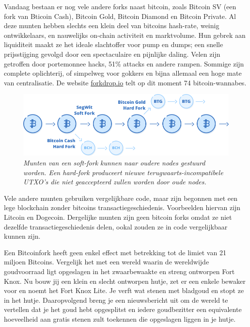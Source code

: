 \documentclass[smalldemyvopaper,11pt,twoside,onecolumn,openright,extrafontsizes]{memoir}
\newlength\drop
\begin{document}
Vandaag bestaan er nog vele andere forks naast bitcoin, zoals Bitcoin SV (een fork van Bticoin Cash), Bitcoin Gold, Bitcoin Diamond en Bitcoin Private. Al deze munten hebben slechts een klein deel van bitcoins hash-rate, weinig ontwikkelaars, en nauwelijks on-chain activiteit en marktvolume. Hun gebrek aan liquiditeit maakt ze het ideale slachtoffer voor pump en dumps; een snelle prijsstijging gevolgd door een spectaculaire en pijnlijke daling. Velen zijn getroffen door portemonnee hacks, 51\% attacks en andere rampen. Sommige zijn complete oplichterij, of simpelweg voor gokkers en bijna allemaal een hoge mate van centralisatie. De website \href{https://forkdrop.io/}{forkdrop.io} telt op dit moment 74 bitcoin-wannabes.

\begin{figure}
    \centering
    \includegraphics[width=\textwidth]{images/fig15.png}
    \caption{\footnotesize{\textit{Munten van een soft-fork kunnen naar oudere nodes gestuurd worden. Een hard-fork produceert nieuwe terugwaarts-incompatibele UTXO's die niet geaccepteerd zullen worden door oude nodes.}}}
    \label{fig15}
\end{figure}

Vele andere munten gebruiken vergelijkbare code, maar zijn begonnen met een lege blockchain zonder bitcoins transactiegeschiedenis. Voorbeelden hiervan zijn Litcoin en Dogecoin. Dergelijke munten zijn geen bitcoin forks omdat ze niet dezelfde transactiegeschiedenis delen, ookal zouden ze in code vergelijkbaar kunnen zijn. 

Een Bitcoinfork heeft geen enkel effect met betrekking tot de limiet van 21 miljoen Bitcoins. Vergelijk het met een wereld waarin de wereldwijde goudvoorraad ligt opgeslagen in het zwaarbewaakte en streng ontworpen Fort Knox. Nu bouw jij een klein en slecht ontworpen hutje, zet er een enkele bewaker voor en noemt het Fort Knox Lite. Je verft wat stenen met bladgoud en stopt ze in het hutje. Daaropvolgend breng je een nieuwsbericht uit om de wereld te vertellen dat je het goud hebt opgesplitst en iedere goudbezitter een equivalente hoeveelheid aan gratis stenen zult toekennen die opgeslagen liggen in je hutje. 
\end{document}
